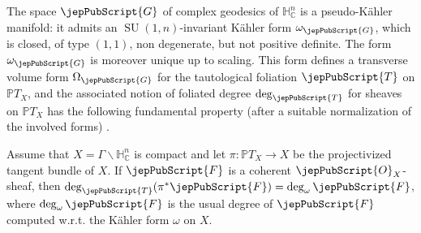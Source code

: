 The space $\jepPubScript{G}$ of complex geodesics of $\mathbb H^n_{\mathbb C}$ is a pseudo-Kähler manifold: it admits an $\operatorname{SU}(1,n)$-invariant Kähler form $\omega_{\jepPubScript{G}}$, which is closed, of type $(1,1)$, non degenerate, but not positive definite. The form $\omega_{\jepPubScript{G}}$ is moreover unique up to scaling. This form defines a transverse volume form $\Omega_{\jepPubScript{G}}$ for the tautological foliation $\jepPubScript{T}$ on $\mathbb PT_X$, and the associated notion of foliated degree $\deg_{\jepPubScript{T}}$ for sheaves on $\mathbb PT_X$ has the following fundamental property (after a suitable normalization of the involved forms) \cite[Prop.~3.1]{jep93KM17}.
\begin{proposition}
Assume that $X=\Gamma\backslash\mathbb H^n_{\mathbb C}$ is compact and let $\pi:\mathbb PT_X\to X$ be the projectivized tangent bundle of $X$. If $\jepPubScript{F}$ is a coherent $\jepPubScript{O}_X$-sheaf, then $\deg_{\jepPubScript{T}}(\pi^*\jepPubScript{F})=\deg_\omega\jepPubScript{F}$, where $\deg_\omega\jepPubScript{F}$ is the usual degree of $\jepPubScript{F}$ computed w.r.t. the Kähler form $\omega$ on $X$.
\end{proposition}


